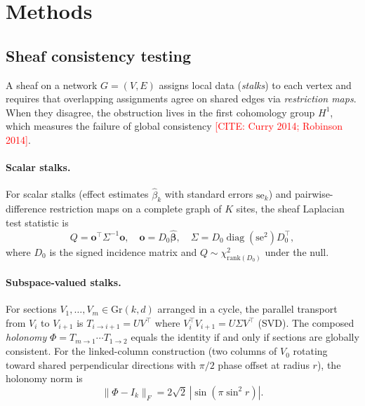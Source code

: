 \documentclass[11pt]{article}
\newcommand{\Gr}{\mathrm{Gr}}
\newcommand{\misscite}[1]{\textcolor{red}{[CITE: #1]}}
\begin{document}
\section{Methods}
\label{sec:methods}

\subsection{Sheaf consistency testing}
\label{sec:meth-sheaf}

A sheaf on a network $G = (V, E)$ assigns local data (\emph{stalks}) to each vertex and requires that overlapping assignments agree on shared edges via \emph{restriction maps}.
When they disagree, the obstruction lives in the first cohomology group $H^1$, which measures the failure of global consistency \misscite{Curry 2014; Robinson 2014}.

\paragraph{Scalar stalks.}
For scalar stalks (effect estimates $\hat\beta_k$ with standard errors $\mathrm{se}_k$) and pairwise-difference restriction maps on a complete graph of $K$ sites, the sheaf Laplacian test statistic is
\begin{equation}
    Q = \mathbf{o}^\top \Sigma^{-1} \mathbf{o}, \quad
    \mathbf{o} = D_0 \boldsymbol{\hat\beta}, \quad
    \Sigma = D_0 \operatorname{diag}(\mathrm{se}^2) D_0^\top,
    \label{eq:sheaf-Q}
\end{equation}
where $D_0$ is the signed incidence matrix and $Q \sim \chi^2_{\mathrm{rank}(D_0)}$ under the null.

\paragraph{Subspace-valued stalks.}
For sections $V_1, \ldots, V_m \in \Gr(k,d)$ arranged in a cycle, the parallel transport from $V_i$ to $V_{i+1}$ is $T_{i \to i+1} = U V^\top$ where $V_i^\top V_{i+1} = U \Sigma V^\top$ (SVD).
The composed \emph{holonomy} $\Phi = T_{m \to 1} \cdots T_{1 \to 2}$ equals the identity if and only if sections are globally consistent.
For the linked-column construction (two columns of $V_0$ rotating toward shared perpendicular directions with $\pi/2$ phase offset at radius $r$), the holonomy norm is
\begin{equation}\label{eq:berry}
    \|\Phi - I_k\|_F = 2\sqrt{2}\,|\sin(\pi \sin^2 r)|.
\end{equation}
\end{document}
